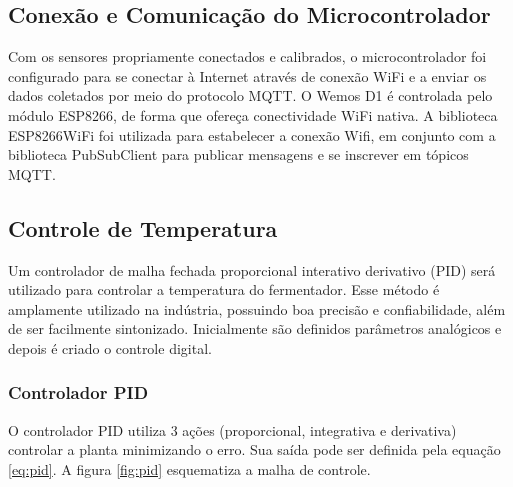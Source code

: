 




\subsection{Conexão e Comunicação do Microcontrolador}

Com os sensores propriamente conectados e calibrados, o microcontrolador foi configurado para se conectar à Internet através de conexão WiFi e a enviar os dados coletados por meio do protocolo MQTT. O Wemos D1 é controlada pelo módulo ESP8266, de forma que ofereça conectividade WiFi nativa. 
A biblioteca ESP8266WiFi foi utilizada para estabelecer a conexão Wifi, em conjunto com a biblioteca PubSubClient para publicar mensagens e se inscrever em tópicos MQTT. 



\subsection{Controle de Temperatura}

Um controlador de malha fechada proporcional interativo derivativo (PID) será utilizado para controlar a temperatura do fermentador. Esse método é amplamente utilizado na indústria, possuindo boa precisão e confiabilidade, além de ser facilmente sintonizado. Inicialmente são definidos parâmetros analógicos e depois é criado o controle digital.


\subsubsection{Controlador PID}

O controlador PID utiliza 3 ações (proporcional, integrativa e derivativa) controlar a planta minimizando o erro. Sua saída pode ser definida pela equação \ref{eq:pid}. A figura \ref{fig:pid} esquematiza a malha de controle.

